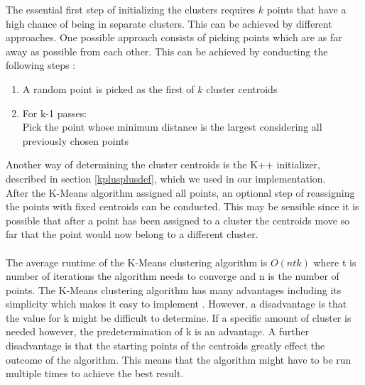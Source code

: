 The essential first step of initializing the clusters requires $k$ points that have a high chance of being in separate clusters. This can be achieved by different approaches. One possible approach consists of picking points which are as far away as possible from each other. This can be achieved by conducting the following steps \cite{MMDS}:
\begin{enumerate}
	\item	A random point is picked as the first of $k$ cluster centroids
	\item	For k-1 passes: \\
	Pick the point whose minimum distance is the largest considering all previously chosen points
	
\end{enumerate}
Another way of determining the cluster centroids is the K++ initializer, described in section \ref{kplusplusdef}, which we used in our implementation.\\
After the K-Means algorithm assigned all points, an optional step of reassigning the points with fixed centroids can be conducted. This may be sensible since it is possible that after a point has been assigned to a cluster the centroids move so far that the point would now belong to a different cluster.\\
\ \\
The average runtime of the K-Means clustering algorithm is $O(ntk)$ where t is number of iterations the algorithm needs to converge \cite{scikit-learn-extra} and n is the number of points.
The K-Means clustering algorithm has many advantages including its simplicity which makes it easy to implement \cite{santini2016advantages}. However, a disadvantage is that the value for k might be difficult to determine. If a specific amount of cluster is needed however, the predetermination of k is an advantage. A further disadvantage is that the starting points of the centroids greatly effect the outcome of the algorithm. This means that the algorithm might have to be run multiple times to achieve the best result.
